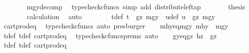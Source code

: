 \begin{isabellebody}
\ \ \ \ \ \ \isamarkupfalse%
\ mgy{\isacharunderscore}{\kern0pt}decomp\ \isamarkupfalse%
\ {\isacharparenleft}{\kern0pt}typecheck{\isacharunderscore}{\kern0pt}cfuncs{\isacharcomma}{\kern0pt}\ simp\ add{\isacharcolon}{\kern0pt}\ distribute{\isacharunderscore}{\kern0pt}left{\isacharunderscore}{\kern0pt}ap{\isacharparenright}{\kern0pt}\isanewline
\ \ \ \ \isamarkupfalse%
\ \isamarkupfalse%
\ {\isacharquery}{\kern0pt}thesis\isanewline
\ \ \ \ \ \ \isamarkupfalse%
\ calculation\ \isamarkupfalse%
\ auto\isanewline
\ \ \isamarkupfalse%
\isanewline
\ \ \isamarkupfalse%
\ \isamarkupfalse%
\ t{\isacharunderscore}{\kern0pt}def{}{\isacharcolon}{\kern0pt}\ {\isachardoublequoteopen}t\ {\isacharequal}{\kern0pt}\ {\isasymlangle}gz{\isacharcomma}{\kern0pt}\ mgy{}{\isasymrangle}{\isachardoublequoteclose}\ \ u{\isacharunderscore}{\kern0pt}def{\isacharcolon}{\kern0pt}\ {\isachardoublequoteopen}u\ {\isacharequal}{\kern0pt}\ {\isasymlangle}gz{\isacharcomma}{\kern0pt}\ mgy{}{\isasymrangle}{\isachardoublequoteclose}\isanewline
\ \ \ \ \isamarkupfalse%
\ cart{\isacharunderscore}{\kern0pt}prod{\isacharunderscore}{\kern0pt}eq{}\ \isamarkupfalse%
\ {\isacharparenleft}{\kern0pt}typecheck{\isacharunderscore}{\kern0pt}cfuncs{\isacharcomma}{\kern0pt}\ auto{\isacharcomma}{\kern0pt}\ presburger{\isacharparenright}{\kern0pt}\isanewline
\ \ \isamarkupfalse%
\ mhy{}{\isacharunderscore}{\kern0pt}eq{\isacharunderscore}{\kern0pt}mgy{}{\isacharcolon}{\kern0pt}\ {\isachardoublequoteopen}mhy{}\ {\isacharequal}{\kern0pt}\ mgy{}{\isachardoublequoteclose}\isanewline
\ \ \ \ \isamarkupfalse%
\ t{\isacharunderscore}{\kern0pt}def{}\ t{\isacharunderscore}{\kern0pt}def\ cart{\isacharunderscore}{\kern0pt}prod{\isacharunderscore}{\kern0pt}eq{}\ \isamarkupfalse%
\ {\isacharparenleft}{\kern0pt}typecheck{\isacharunderscore}{\kern0pt}cfuncs{\isacharunderscore}{\kern0pt}prems{\isacharcomma}{\kern0pt}\ auto{\isacharparenright}{\kern0pt}\isanewline
\ \ \isamarkupfalse%
\ gy{\isacharunderscore}{\kern0pt}eq{\isacharunderscore}{\kern0pt}gz{\isacharcolon}{\kern0pt}\ {\isachardoublequoteopen}hz\ {\isacharequal}{\kern0pt}\ gz{\isachardoublequoteclose}\isanewline
\ \ \ \ \isamarkupfalse%
\ t{\isacharunderscore}{\kern0pt}def{}\ t{\isacharunderscore}{\kern0pt}def\ cart{\isacharunderscore}{\kern0pt}prod{\isacharunderscore}{\kern0pt}eq{}\ \isamarkupfalse%

\end{isabellebody}

